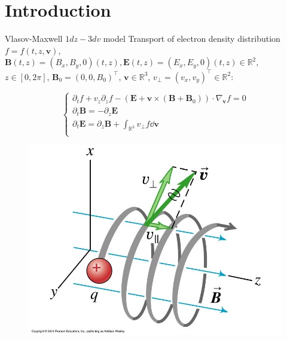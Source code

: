 \documentclass{beamer}
\newcommand{\Mvb}[1]{\boldsymbol{#1}}
\begin{document}
\section{Introduction}
\begin{frame}{Vlasov-Maxwell $1dz-3dv$ model}
  Transport of electron density distribution $f=f(t,z,\Mvb{v})$,\\
  $\Mvb{B}(t,z)=(B_x,B_y,0)(t,z),\Mvb{E}(t,z)=(E_x,E_y,0)(t,z)\in\mathbb{R}^2$,\\
  $z\in[0,2\pi]$, $\Mvb{B}_0 = (0,0,B_0)^\top$, $\Mvb{v}\in\mathbb{R}^3$, $v_\perp=(v_x,v_y)^\top\in\mathbb{R}^2$:

  $$
    \begin{cases}
      \partial_t f + v_z\partial_z f - (\Mvb{E}+\Mvb{v}\times(\Mvb{B}+\Mvb{B}_0))\cdot\nabla_{\Mvb{v}} f = 0 \\
      \partial_t \Mvb{B} = -\partial_z\Mvb{E}\\
      \partial_t \Mvb{E} = \partial_z\Mvb{B} + \int_{\mathbb{R}^3} v_\perp f\dd{\Mvb{v}} \\
    \end{cases}
  $$
  \begin{figure}
    \centering
    \vspace{-1cm}
    \hspace{5cm}\includegraphics[height=0.5\textheight]{img/helix}
  \end{figure}
\end{frame}
\end{document}
